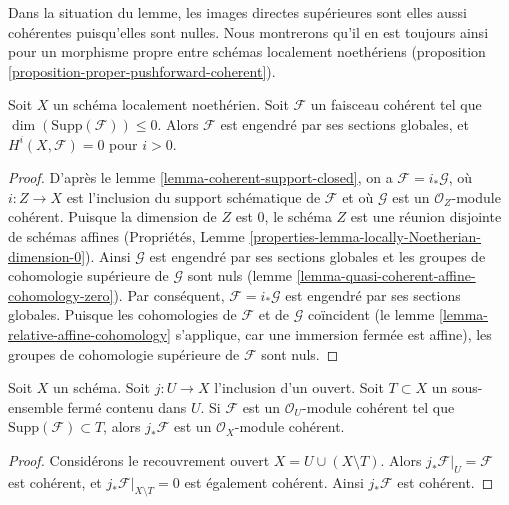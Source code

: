 \noindent
Dans la situation du lemme, les images directes supérieures sont elles
aussi cohérentes puisqu'elles sont
nulles. Nous montrerons qu'il en est toujours ainsi pour un morphisme propre
entre schémas localement noethériens
(proposition \ref{proposition-proper-pushforward-coherent}).

\begin{lemma}
\label{lemma-coherent-support-dimension-0}
Soit $X$ un schéma localement noethérien. Soit $\mathcal{F}$
un faisceau cohérent tel que $\dim(\text{Supp}(\mathcal{F})) \leq 0$.
Alors $\mathcal{F}$ est engendré par ses sections globales, et
$H^i(X, \mathcal{F}) = 0$ pour $i > 0$.
\end{lemma}

\begin{proof}
D'après le lemme \ref{lemma-coherent-support-closed}, on a
$\mathcal{F} = i_*\mathcal{G}$, où $i : Z \to X$ est l'inclusion
du support schématique de $\mathcal{F}$ et où $\mathcal{G}$
est un $\mathcal{O}_Z$-module cohérent. Puisque la dimension de $Z$ est
$0$, le schéma $Z$ est une réunion disjointe de schémas affines (Propriétés, Lemme
\ref{properties-lemma-locally-Noetherian-dimension-0}).
Ainsi $\mathcal{G}$ est engendré par ses sections globales et les groupes
de cohomologie supérieure de $\mathcal{G}$ sont nuls
(lemme \ref{lemma-quasi-coherent-affine-cohomology-zero}). Par
conséquent, $\mathcal{F} = i_*\mathcal{G}$ est engendré par ses
sections globales. Puisque les cohomologies de $\mathcal{F}$ et de $\mathcal{G}$ coïncident (le
lemme \ref{lemma-relative-affine-cohomology} s'applique, car une
immersion fermée est
affine), les groupes de cohomologie supérieure de $\mathcal{F}$ sont nuls.
\end{proof}

\begin{lemma}
\label{lemma-pushforward-coherent-on-open}
Soit $X$ un schéma. Soit $j : U \to X$ l'inclusion d'un ouvert.
Soit $T \subset X$ un sous-ensemble fermé contenu dans $U$.
Si $\mathcal{F}$ est un $\mathcal{O}_U$-module cohérent
tel que $\text{Supp}(\mathcal{F}) \subset T$, alors
$j_*\mathcal{F}$ est un $\mathcal{O}_X$-module cohérent.
\end{lemma}

\begin{proof}
Considérons le recouvrement ouvert $X = U \cup (X \setminus T)$.
Alors $j_*\mathcal{F}|_U = \mathcal{F}$ est cohérent, et
$j_*\mathcal{F}|_{X \setminus T} = 0$ est également cohérent.
Ainsi $j_*\mathcal{F}$ est cohérent.
\end{proof}














